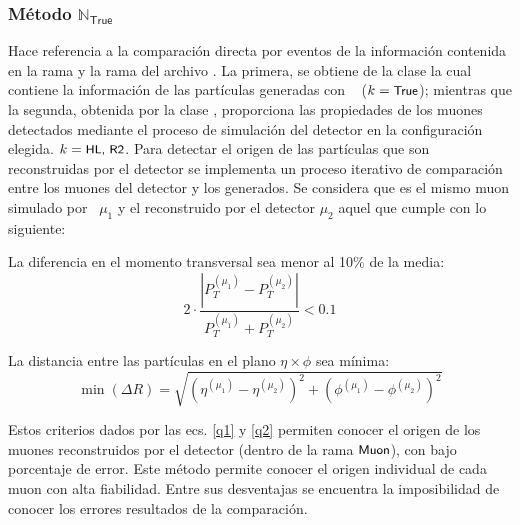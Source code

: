 \subsubsection{Método $\mathbb{N}_\textsf{True}$}
Hace referencia a la comparación directa por eventos de la información contenida en la rama  y la rama  del archivo . La primera, se obtiene de la clase  la cual contiene la información de las partículas generadas con \MC ~ ($k=\textsf{\small True}$); mientras que la segunda, obtenida por la clase , proporciona las propiedades de los muones detectados mediante el proceso de simulación del detector en la configuración elegida. $k=\textsf{\small HL, R2}$. %
Para detectar el origen de las partículas que son reconstruidas por el detector se implementa un proceso iterativo de comparación entre los muones del detector y los generados. Se considera que es el mismo muon simulado por \MC~$\mu_1$ y el reconstruido por el detector $\mu_2$ aquel que cumple con lo siguiente: 
\begin{itemize_f}
\item La diferencia en el momento transversal sea menor al 10\% de la media:
\begin{equation}\label{q1}
2\cdot \dfrac{\left|P_T^{(\mu_1)}-P_T^{(\mu_2)}\right|}{P_T^{(\mu_1)}+P_T^{(\mu_2)}} < 0.1
\end{equation} 
\item La distancia entre las partículas en el plano $\eta \times \phi$ sea mínima:
\begin{equation}\label{q2}
\min{(\Delta R)} = \sqrt{\left(\eta^{(\mu_1)} - \eta^{(\mu_2)}\right)^2 + \left(\phi^{(\mu_1)} - \phi^{(\mu_2)}\right)^2}
\end{equation}
\end{itemize_f} 
Estos criterios dados por las ecs. \ref{q1} y \ref{q2} permiten conocer el origen de los muones reconstruidos por el detector (dentro de la rama $\textsf{\small Muon}$), con bajo porcentaje de error. Este método permite conocer el origen individual de cada muon con alta fiabilidad. Entre sus desventajas se encuentra la imposibilidad de conocer los errores resultados de la comparación. %

